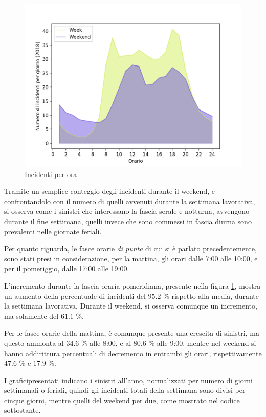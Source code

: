 \documentclass[a4paper,12pt]{report}
\newcommand{\quotestyle}[1]{\textit{#1}}
\begin{document}
\begin{figure}
    \includegraphics[width=\linewidth]{../src/incidenti/incidenti_senza_coords/ore_punta/week_weekend.png}
    \caption{Incidenti per ora}
    \label{fig:week-weekend}
\end{figure}

Tramite un semplice conteggio degli incidenti durante il weekend, e 
confrontandolo con il numero di quelli avvenuti durante la 
settimana lavorativa, si osserva come i sinistri che interessano la fascia serale 
e notturna, avvengono durante il fine settimana, quelli invece che sono commessi 
in fascia diurna sono prevalenti nelle giornate feriali. 

Per quanto riguarda, le fasce orarie \quotestyle{di punta} di cui si 
è parlato precedentemente, 
sono stati presi in considerazione, per la mattina, gli orari dalle 7:00 alle 10:00, 
e per il pomeriggio, dalle 17:00 alle 19:00. 

L'incremento durante la fascia oraria pomeridiana, presente nella figura 
\ref{fig:week-weekend}, mostra un aumento della percentuale di incidenti 
del $95.2$ \% rispetto alla media, durante la settimana lavorativa. 
Durante il weekend, si osserva comunque un incremento, ma solamente del $61.1$ \%. 

Per le fasce orarie della mattina, è comunque presente una crescita di sinistri, 
ma questo ammonta al $34.6$ \% alle 8:00, e al $80.6$ \% alle 9:00, 
mentre nel weekend si hanno addirittura percentuali di decremento 
in entrambi gli orari, rispettivamente $47.6$ \% e $17.9$ \%. 

I graficipresentati indicano i sinistri all'anno, normalizzati per numero di 
giorni settimanali o feriali, quindi gli incidenti totali della settimana sono divisi 
per cinque giorni, mentre quelli del weekend per due, 
come mostrato nel codice sottostante. 
\end{document}
